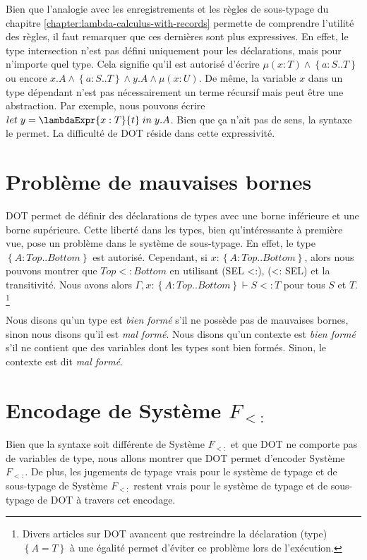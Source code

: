 Bien que l'analogie avec les enregistrements et les règles de sous-typage du
chapitre \ref{chapter:lambda-calculus-with-records} permette de comprendre
l'utilité des règles, il faut remarquer que ces dernières sont plus expressives. En
effet, le type intersection n'est pas défini uniquement pour les déclarations,
mais pour n'importe quel type. Cela signifie qu'il est autorisé d'écrire $\mu(x
: T) \wedge \left\{ a : S .. T \right\}$ ou encore $x.A \wedge \left\{ a : S ..
  T \right\} \wedge y.A \wedge \mu(x : U)$.
De même, la variable $x$ dans un type dépendant n'est pas nécessairement un
terme récursif mais peut être une abstraction. Par exemple, nous pouvons écrire
$let \; y = \lambdaExpr{x : T}{t} \; in \; y.A$. Bien que ça n'ait pas de sens, la
syntaxe le permet.
La difficulté de DOT réside dans cette expressivité.

\section{Problème de mauvaises bornes}

DOT permet de définir des déclarations de types avec une borne inférieure et une
borne supérieure. Cette liberté dans les types, bien qu'intéressante à première
vue, pose un problème dans le système de sous-typage.
En effet, le type $\left\{ A : Top .. Bottom \right\}$ est autorisé. Cependant,
si $x : \left\{ A : Top .. Bottom \right\}$, alors nous pouvons montrer que
$Top <: Bottom$ en utilisant (SEL <:), (<: SEL) et la transitivité. Nous avons
alors $\Gamma, x : \left\{ A : Top .. Bottom \right\} \vdash S <: T$ pour tous
$S$ et $T$.
\footnote{Divers articles sur DOT \cite{OOPSLA-DOT-2016} avancent que restreindre la
déclaration (type) $\left\{ A = T \right\}$ à une égalité permet d'éviter ce
problème lors de l'exécution.}

Nous disons qu'un type est \textit{bien formé} s'il ne possède pas de mauvaises
bornes, sinon nous disons qu'il est \textit{mal formé}. Nous disons qu'un
contexte est \textit{bien formé} s'il ne contient que des variables dont les types
sont bien formés. Sinon, le contexte est dit \textit{mal formé}.

\section{Encodage de Système $F_{<:}$}

Bien que la syntaxe soit différente de Système $F_{<:}$ et que DOT ne comporte
pas de variables de type, nous allons montrer que DOT permet d'encoder Système
$F_{<:}$. De plus, les jugements de typage vrais pour le système de typage et de
sous-typage de Système $F_{<:}$ restent vrais pour le système de typage et de
sous-typage de DOT à travers cet encodage.

